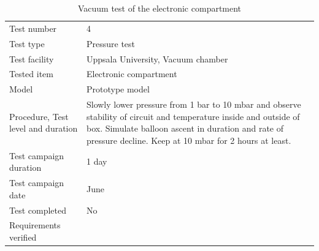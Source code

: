 \documentclass[ %
  a4paper, %
  11pt, %
  openany, %
  parskip, %
  toc=totoc, %
  listof=totoc, %
  bibliography=totoc %
]{scrreprt} %
\providecommand{\DIFaddbeginFL}{} %
\providecommand{\DIFaddendFL}{} %
\providecommand{\DIFdelbeginFL}{} %
\providecommand{\DIFdelendFL}{} %
\providecommand{\DIFscaledelfig}{0.5}
\newlength{\DIFdelgraphicswidth} %
\newlength{\DIFdelgraphicsheight} %
\providecommand{\DIFaddincludegraphics}[2][]{{\color{blue}\fbox{\DIFOincludegraphics[#1]{#2}}}} %
\providecommand{\DIFdelincludegraphics}[2][]{%
\sbox{\DIFdelgraphicsbox}{\DIFOincludegraphics[#1]{#2}}%
\settoboxwidth{\DIFdelgraphicswidth}{\DIFdelgraphicsbox} %
\settoboxtotalheight{\DIFdelgraphicsheight}{\DIFdelgraphicsbox} %
\scalebox{\DIFscaledelfig}{%
\parbox[b]{\DIFdelgraphicswidth}{\usebox{\DIFdelgraphicsbox}\\[-\baselineskip] \rule{\DIFdelgraphicswidth}{0em}}\llap{\resizebox{\DIFdelgraphicswidth}{\DIFdelgraphicsheight}{%
\setlength{\unitlength}{\DIFdelgraphicswidth}%
\begin{picture}(1,1)%
\thicklines\linethickness{2pt} %
{\color[rgb]{1,0,0}\put(0,0){\framebox(1,1){}}}%
{\color[rgb]{1,0,0}\put(0,0){\line( 1,1){1}}}%
{\color[rgb]{1,0,0}\put(0,1){\line(1,-1){1}}}%
\end{picture}%
}\hspace*{3pt}}} %
} %
\DeclareRobustCommand{\DIFaddbeginFL}{\DIFOaddbeginFL \let\includegraphics\DIFaddincludegraphics} %
\DeclareRobustCommand{\DIFaddendFL}{\DIFOaddendFL \let\includegraphics\DIFOincludegraphics} %
\DeclareRobustCommand{\DIFdelbeginFL}{\DIFOdelbeginFL \let\includegraphics\DIFdelincludegraphics} %
\DeclareRobustCommand{\DIFdelendFL}{\DIFOaddendFL \let\includegraphics\DIFOincludegraphics} %
\begin{document}
\begin{table}[H]
\centering
\caption{Vacuum test of the electronic compartment}
\DIFdelbeginFL %
\DIFdelendFL \DIFaddbeginFL \label{tab:test4}
\begin{tabular}{L{5cm}L{10cm}}
\toprule
Test number & 4 \\
Test type & Pressure test \\
Test facility & Uppsala University, Vacuum chamber \\
Tested item & Electronic compartment \\
Model & Prototype model \\
Procedure, Test level and duration & Slowly lower pressure from 1 bar to 10 mbar and observe stability of circuit and temperature inside and outside of box. Simulate balloon ascent in duration and rate of pressure decline. Keep at 10 mbar for 2 hours at least. \\
Test campaign duration & 1 day \\
Test campaign date & June \\
Test completed & No \\
Requirements verified & \\
\bottomrule
\end{tabular}
\DIFaddendFL \end{table}
\end{document}
